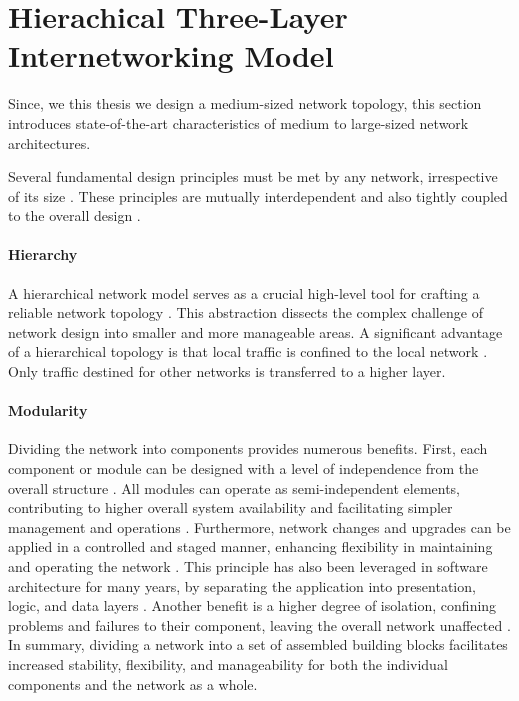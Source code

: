 
\section{Hierachical Three-Layer Internetworking Model} %
\label{sec:Hierachical Three-Layer Internet Model}
Since, we this thesis we design a medium-sized network topology, this section 
    introduces state-of-the-art characteristics of medium to large-sized
    network architectures.

Several fundamental design principles must be met by any network, irrespective
    of its size \cite{cisco_net_size}.
These principles are mutually interdependent and also tightly coupled to the
    overall design \cite{cisco_campus_net}.

\paragraph{Hierarchy} %
\label{par:Hierarchy}
A hierarchical network model serves as a crucial high-level
    tool for crafting a reliable network topology \cite{cisco_net_size}.
This abstraction dissects the complex challenge of network design into smaller
    and more manageable areas.
A significant advantage of a hierarchical topology is that local traffic
    is confined to the local network \cite{cisco_campus_net}.
Only traffic destined for other networks is transferred to a higher layer.


\paragraph{Modularity} %
\label{par:Modularity}
Dividing the network into components provides numerous benefits.
First, each component or module can be designed with a level of independence
    from the overall structure \cite{cisco_net_size}.
All modules can operate as semi-independent elements, contributing to higher
    overall system availability and facilitating simpler management and
    operations \cite{cisco_campus_net}.
Furthermore, network changes and upgrades can be applied in a controlled and
    staged manner, enhancing flexibility in maintaining and operating the
    network \cite{cisco_net_size}.
This principle has also been leveraged in software architecture for many years,
    by separating the application into presentation, logic, and data layers
    \cite{sw_arch}.
Another benefit is a higher degree of isolation, confining problems and
    failures to their component, leaving the overall network unaffected
    \cite{cisco_design_guide}.
In summary, dividing a network into a set of assembled building blocks
    facilitates increased stability, flexibility, and manageability for both
    the individual components and the network as a whole.
    \cite{cisco_campus_net}

